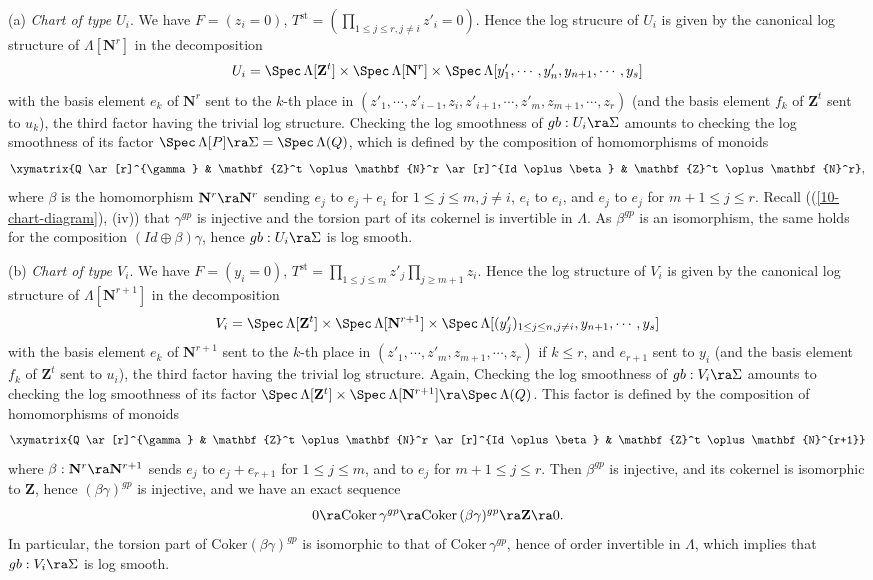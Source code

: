 \documentclass[10pt]{../fichiers-configuration-latex/smfart}
\begin{document}
(a) \textit{Chart of type $U_i$}. We have $F = (z_i = 0)$, $T^{\mathrm{st}}
= (\prod_{1 \le j \le r, j \ne i}z'_i = 0)$. Hence the log strucure of
$U_i$ is given by the canonical log structure of $\Lambda[\mathbf{N}^r]$
in the decomposition $$ U_i = \Spec \, \Lambda[\mathbf{Z}^t] \times \Spec \,
\Lambda[\mathbf{N}^r] \times \Spec \, \Lambda[y'_1, \cdots, y'_n, y_{n+1},
\cdots, y_s] $$ with the basis element $e_k$ of $\mathbf{N}^r$ sent to the
$k$-th place in $(z'_1,\cdots, z'_{i-1}, z_i, z'_{i+1}, \cdots, z'_m, z_{m+1},
\cdots, z_r)$ (and the basis element $f_k$ of $\mathbf{Z}^t$ sent to $u_k$),
the third factor having the trivial log structure. Checking the log smoothness
of $gb : U_i \ra \Sigma$ amounts to checking the log smoothness of its factor
$\Spec \, \Lambda[P] \ra \Sigma = \Spec \, \Lambda(Q)$, which is defined by the
composition of homomorphisms of monoids $$ \xymatrix{Q \ar[r]^{\gamma} &
\mathbf{Z}^t \oplus  \mathbf{N}^r \ar[r]^{Id \oplus \beta} & \mathbf{Z}^t
\oplus \mathbf{N}^r}, $$ where $\beta$ is the homomorphism $\mathbf{N}^r
\ra \mathbf{N}^r$ sending $e_j$ to $e_j + e_i$ for $1 \le j \le m, j
\ne i$, $e_i$ to $e_i$, and $e_j$ to $e_j$ for $m+1 \le j \le r$. Recall
((\ref{10-chart-diagram}), (iv)) that $\gamma^{gp}$ is injective and the
torsion part of its cokernel is invertible in $\Lambda$. As $\beta^{gp}$ is
an isomorphism, the same holds for the composition $(Id \oplus \beta)\gamma$,
hence $gb : U_i \ra \Sigma$ is log smooth.

\medskip (b) \textit{Chart of type $V_i$}. We have $F = (y_i = 0)$,
$T^{\mathrm{st}} = \prod_{1 \le j \le m}z'_j\prod_{j \ge m+1}z_i$. Hence
the log structure of $V_i$ is given by the canonical log structure
of $\Lambda[\mathbf{N}^{r+1}]$ in the decomposition $$ V_i = \Spec \,
\Lambda[\mathbf{Z}^t] \times \Spec \, \Lambda[\mathbf{N}^{r+1}] \times \Spec
\, \Lambda[(y'_j)_{1 \le j \le n, j \ne i}, y_{n+1}, \cdots, y_s] $$
with the basis element $e_k$ of $\mathbf{N}^{r+1}$ sent to the $k$-th
place in $(z'_1,\cdots, z'_m, z_{m+1}, \cdots, z_r)$ if $k \le r$, and
$e_{r+1}$ sent to $y_i$ (and the basis element $f_k$ of $\mathbf{Z}^t$
sent to $u_i$), the third factor having the trivial log structure. Again,
Checking the log smoothness of $gb : V_i \ra \Sigma$ amounts to checking
the log smoothness of its factor $\Spec \, \Lambda[\mathbf{Z}^t] \times \Spec \,
\Lambda[\mathbf{N}^{r+1}] \ra \Spec \, \Lambda(Q)$. This factor is defined by
the composition of homomorphisms of monoids $$ \xymatrix{Q \ar[r]^{\gamma}
& \mathbf{Z}^t \oplus \mathbf{N}^r \ar[r]^{Id \oplus \beta} & \mathbf{Z}^t
\oplus \mathbf{N}^{r+1}} $$ where $\beta : \mathbf{N}^r \ra \mathbf{N}^{r+1}$
sends $e_j$ to $e_j + e_{r+1}$ for $1 \le j \le m$, and to $e_j$ for  $m+1
\le j \le r$. Then $\beta^{gp}$ is injective, and its cokernel is isomorphic
to $\mathbf{Z}$, hence $(\beta \gamma)^{gp}$ is injective, and we have an
exact sequence $$ 0 \ra \mathrm{Coker}\,  \gamma^{gp} \ra \mathrm{Coker} \,
(\beta \gamma)^{gp} \ra \mathbf{Z} \ra 0.  $$ In particular, the torsion
part of $\mathrm{Coker} (\beta \gamma)^{gp}$ is isomorphic to that of
$\mathrm{Coker} \, \gamma^{gp}$, hence of order invertible in $\Lambda$,
which implies that $gb : V_i \ra \Sigma$ is log smooth.
\end{document}
